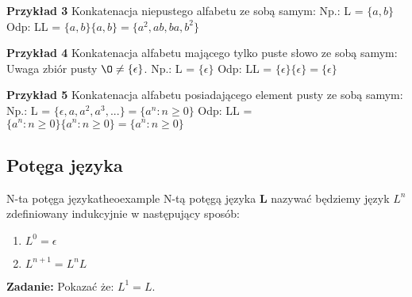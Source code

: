 		
		\begin{tcolorbox}
			\textbf{Przykład 3} \newline
			Konkatenacja niepustego alfabetu ze sobą samym: \newline 
				Np.: L = $\{ a,b \}$ \newline
				Odp: LL = $\{a, b\}\{a, b\} = \{a^{2}, ab, ba, b^{2}\}$
		\end{tcolorbox}
		
		\begin{tcolorbox}
			\textbf{Przykład 4} \newline
			Konkatenacja alfabetu mającego tylko puste słowo ze sobą samym: \newline
			{\color{red} Uwaga  zbiór pusty $\O \neq \{ \epsilon \}$.} \newline
				Np.: L = $\{ \epsilon \}$
				Odp: LL = $\{ \epsilon \}\{ \epsilon \} = \{ \epsilon \}$
		\end{tcolorbox}
		
		\begin{tcolorbox}
			\textbf{Przykład 5} \newline
			Konkatenacja alfabetu posiadającego element pusty ze sobą samym: \newline 
				Np.: L = $\{ \epsilon , a, a^{2}, a^{3}, ... \} =  \{a^{n}: n \ge 0 \}$ \newline
				Odp: LL = $ \{ a^{n}: n \ge 0  \} \{ a^{n}: n \ge 0 \} = \{ a^{n}: n \ge 0 \}$
		\end{tcolorbox}
	
	
	\subsection{Potęga języka}
	
	
	\begin{mytheo}{N-ta potęga języka}{theoexample}
		N-tą potęgą języka \textbf{L} nazywać będziemy język \textbf{$L^{n}$} zdefiniowany indukcyjnie w 	
		następujący sposób: 
	
		\begin{enumerate}[label=(\roman*)]
			\item $L^{0}={\epsilon}$
			\item $L^{n+1}=L^{n}L$
		\end{enumerate} 
	
	\end{mytheo}
	
	
	\begin{tcolorbox}
		\textbf{Zadanie:} \newline
			Pokazać że: $L^{1} = L$.
	\end{tcolorbox}
	
